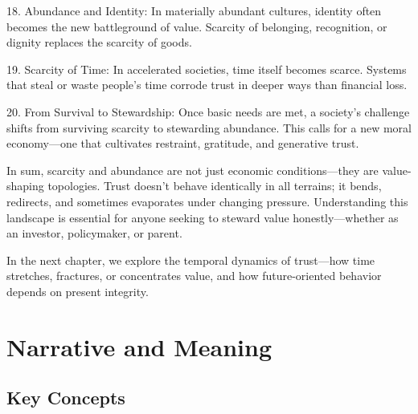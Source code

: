 \documentclass[11pt,oneside]{book}
\begin{document}
18. Abundance and Identity: In materially abundant cultures, identity often becomes the new battleground of value. Scarcity of belonging, recognition, or dignity replaces the scarcity of goods.



19. Scarcity of Time: In accelerated societies, time itself becomes scarce. Systems that steal or waste people’s time corrode trust in deeper ways than financial loss.



20. From Survival to Stewardship: Once basic needs are met, a society's challenge shifts from surviving scarcity to stewarding abundance. This calls for a new moral economy—one that cultivates restraint, gratitude, and generative trust.


In sum, scarcity and abundance are not just economic conditions—they are value-shaping topologies. Trust doesn’t behave identically in all terrains; it bends, redirects, and sometimes evaporates under changing pressure. Understanding this landscape is essential for anyone seeking to steward value honestly—whether as an investor, policymaker, or parent.

In the next chapter, we explore the temporal dynamics of trust—how time stretches, fractures, or concentrates value, and how future-oriented behavior depends on present integrity.


\chapter{ Narrative and Meaning}

\section{Key Concepts}
\end{document}
